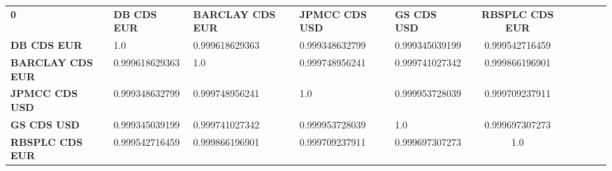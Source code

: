 \begin{center}
 \begin{tabular}{|l|l|l|l|l|c|c|c|c|c|}
\hline
\textbf{0} & \textbf{DB CDS EUR} & \textbf{BARCLAY CDS EUR} & \textbf{JPMCC CDS USD} & \textbf{GS CDS USD} & \textbf{RBSPLC CDS EUR}\\\hhline{|=|=|=|=|=|=|}
\textbf{DB CDS EUR} & 1.0 & 0.999618629363 & 0.999348632799 & 0.999345039199 & 0.999542716459\\
\textbf{BARCLAY CDS EUR} & 0.999618629363 & 1.0 & 0.999748956241 & 0.999741027342 & 0.999866196901\\
\textbf{JPMCC CDS USD} & 0.999348632799 & 0.999748956241 & 1.0 & 0.999953728039 & 0.999709237911\\
\textbf{GS CDS USD} & 0.999345039199 & 0.999741027342 & 0.999953728039 & 1.0 & 0.999697307273\\
\textbf{RBSPLC CDS EUR} & 0.999542716459 & 0.999866196901 & 0.999709237911 & 0.999697307273 & 1.0\\
\hline
\end{tabular}
\end{center}
